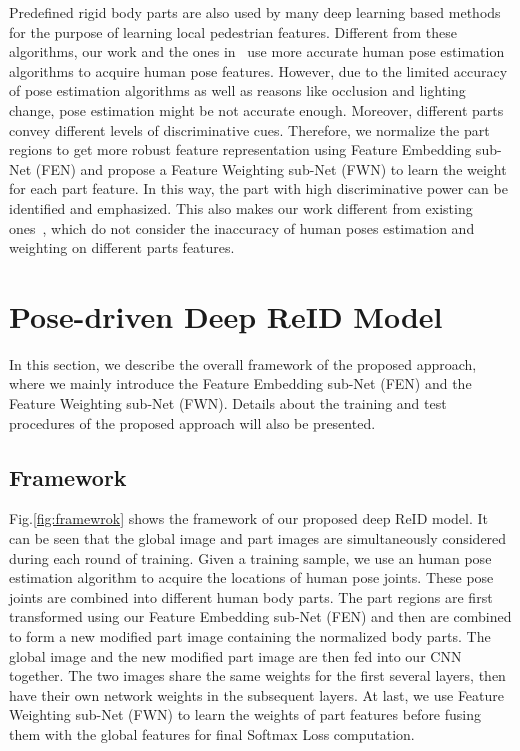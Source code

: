 \documentclass[10pt,twocolumn,letterpaper]{article}
\begin{document}
Predefined rigid body parts are also used by many deep learning based methods~\cite{cheng2016person,varior2016siamese,shi2016embedding} for the purpose of learning local pedestrian features. Different from these algorithms, our work and the ones in~\cite{zheng2017pose,zhao2017spindle} use more accurate human pose estimation algorithms to acquire human pose features. However, due to the limited accuracy of pose estimation algorithms as well as reasons like occlusion and lighting change, pose estimation might be not accurate enough. Moreover, different parts convey different levels of discriminative cues. Therefore, we normalize the part regions to get more robust feature representation using Feature Embedding sub-Net (FEN) and propose a Feature Weighting sub-Net (FWN) to learn the weight for each part feature. In this way, the part with high discriminative power can be identified and emphasized. This also makes our work different from existing ones~\cite{zheng2017pose,zhao2017spindle}, which do not consider the inaccuracy of human poses estimation and weighting on different parts features.

\section{Pose-driven Deep ReID Model }
In this section, we describe the overall framework of the proposed approach, where we mainly introduce the Feature Embedding sub-Net (FEN) and the Feature Weighting sub-Net (FWN). Details about the training and test procedures of the proposed approach will also be presented.


\subsection{Framework}
Fig.\ref{fig:framewrok} shows the framework of our proposed deep ReID model. It can be seen that the global image and part images are simultaneously considered during each round of training. Given a training sample, we use an human pose estimation algorithm to acquire the locations of human pose joints. These pose joints are combined into different human body parts. The part regions are first transformed using our Feature Embedding sub-Net (FEN) and then are combined to form a new modified part image containing the normalized body parts. The global image and the new modified part image are then fed into our CNN together. The two images share the same weights for the first several layers, then have their own network weights in the subsequent layers. At last, we use Feature Weighting sub-Net (FWN) to learn the weights of part features before fusing them with the global features for final Softmax Loss computation.
\end{document}
